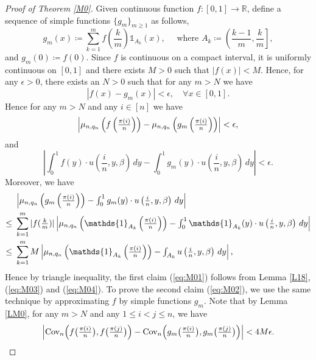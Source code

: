 \begin{proof}[Proof of Theorem \ref{M0}]
Given continuous function $f : [0, 1] \longrightarrow \mathbb{R}$, define a sequence of simple functions $\{g_m\}_{m \ge 1}$ as follows,
\[
\textstyle g_m(x) \coloneqq \sum_{k = 1}^{m} f\left(\frac{k}{m}\right)\mathds{1}_{A_k}(x),  \quad\text{ where } A_k \coloneqq \left(\frac{k-1}{m}, \frac{k}{m}\right],
\]
and $g_m(0) \coloneqq f(0)$. Since $f$ is continuous on a compact interval, it is uniformly continuous on $[0, 1]$ and there exists $M > 0$ such that $|f(x)| < M$. Hence, for any $\epsilon > 0$, there exists an $N > 0$ such that for any $m > N$ we have
\[
|f(x) - g_m(x)| < \epsilon, \quad \forall x \in [0, 1].
\]
Hence for any $m > N$ and any $i \in [n]$ we have
\begin{equation}\label{eq:M03}
\textstyle\left|\mu_{n, q_n} \left( f\left(\frac{\pi(i)}{n}\right) \right) - \mu_{n, q_n} \left( g_m\left(\frac{\pi(i)}{n}\right) \right)\right| < \epsilon,
\end{equation}
and
\begin{equation}\label{eq:M04}
\textstyle\left|\int_0^1 f(y)\cdot u\left(\frac{i}{n}, y, \beta \right)\, dy - \int_0^1 g_m(y)\cdot u\left(\frac{i}{n}, y, \beta \right)\, dy \right| < \epsilon.
\end{equation}
Moreover, we have
\begin{align*}
 &\textstyle\left|\n \left( g_m\left(\frac{\pi(i)}{n}\right) \right) - \int_0^1 g_m(y)\cdot u\left(\frac{i}{n}, y, \beta \right)\, dy \right|\\
\le\ &\sum_{k = 1}^{m}\textstyle|f(\frac{k}{m})|\left|\n \left( \mathds{1}_{A_k}\left(\frac{\pi(i)}{n}\right) \right) - \int_0^1 \mathds{1}_{A_k}(y)\cdot u\left(\frac{i}{n}, y, \beta \right)\, dy \right|\\
\le\ & \sum_{k = 1}^{m}\textstyle M\left|\n \left( \mathds{1}_{A_k}\left(\frac{\pi(i)}{n}\right) \right) - \int_{A_k} u\left(\frac{i}{n}, y, \beta \right)\, dy \right|,
\end{align*}
Hence by triangle inequality, the first claim (\ref{eq:M01}) follows from Lemma \ref{L18}, (\ref{eq:M03}) and (\ref{eq:M04}). To prove the second claim (\ref{eq:M02}), we use the same technique by approximating $f$ by simple functions $g_m$. Note that by Lemma \ref{LM0}, for any $m > N$ and any $1 \le i < j \le n$, we have
\begin{equation}\label{eq:M05}
\textstyle\left| \cov_n\Big(f\big(\frac{\pi(i)}{n}\big), f\big(\frac{\pi(j)}{n}\big)\Big)  -  
\cov_n\Big(g_m\big(\frac{\pi(i)}{n}\big), g_m\big(\frac{\pi(j)}{n}\big)\Big)\right| < 4M \epsilon.

\end{equation}
\end{proof}
